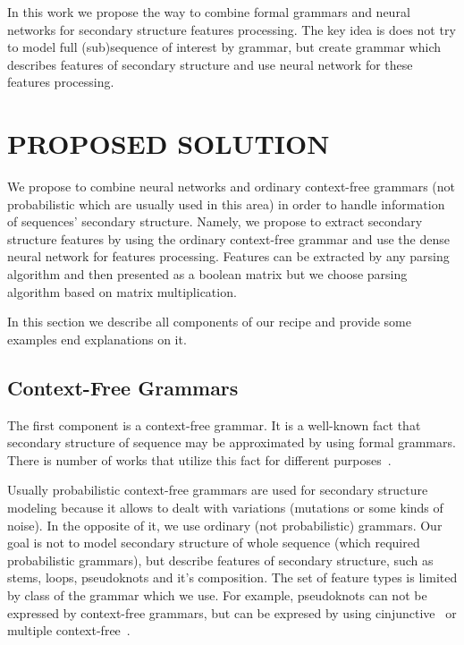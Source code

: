 \documentclass[a4paper,twoside]{article}
\begin{document}
In this work we propose the way to combine formal grammars and neural networks for secondary structure features processing.
The key idea is does not try to model full (sub)sequence of interest by grammar, but create grammar which describes features of secondary structure and use neural network for these features processing.

\section{\uppercase{Proposed solution}}
\label{sec:proposedSolution}

\noindent We propose to combine neural networks and ordinary context-free grammars (not probabilistic which are usually used in this area) in order to handle information of sequences' secondary structure. 
Namely, we propose to extract secondary structure features by using the ordinary context-free grammar and use the dense neural network for features processing.
Features can be extracted by any parsing algorithm and then presented as a boolean matrix but we choose parsing algorithm based on matrix multiplication.

In this section we describe all components of our recipe and provide some examples end explanations on it.
 
\subsection{Context-Free Grammars}

\noindent The first component is a context-free grammar. 
It is a well-known fact that secondary structure of sequence may be approximated by using formal grammars.
There is number of works that utilize this fact for different purposes~\cite{!!!!}.

Usually probabilistic context-free grammars are used for secondary structure modeling because it allows to dealt with variations (mutations or some kinds of noise).
In the opposite of it, we use ordinary (not probabilistic) grammars.
Our goal is not to model secondary structure of whole sequence (which required probabilistic grammars), but describe features of secondary structure, such as stems, loops, pseudoknots and it's composition.
The set of feature types is limited by class of the grammar which we use.
For example, pseudoknots can not be expressed by context-free grammars, but can be expresed by using cinjunctive~\cite{KanchanDevi2017,zier2013rna,Okhotin:2001:CG:543313.543323} or multiple context-free~\cite{SEKI1991191,Riechert:2016:ADP:2972703.2972851}.
\end{document}
